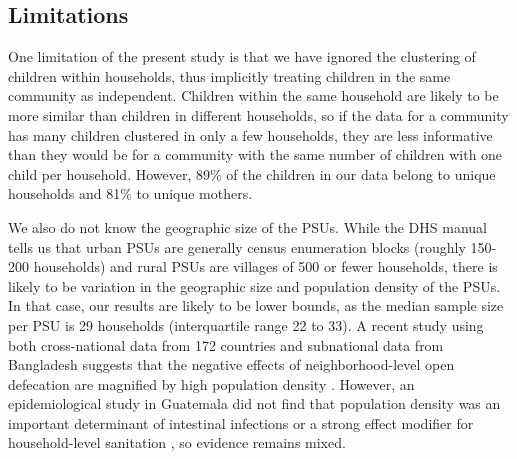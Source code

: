 \documentclass[12pt,a4paper,titlepage]{article}
\begin{document}
\begin{appendices}
\section{Limitations}\label{sec:lims}
One limitation of the present study is that we have ignored the clustering of children within households, thus implicitly treating children in the same community as independent. Children within the same household are likely to be more similar than children in different households, so if the data for a community has many children clustered in only a few households, they are less informative than they would be for a community with the same number of children with one child per household. However, 89\% of the children in our data belong to unique households and 81\% to unique mothers.

We also do not know the geographic size of the PSUs. While the DHS manual tells us that urban PSUs are generally census enumeration blocks (roughly 150-200 households) and rural PSUs are villages of 500 or fewer households, there is likely to be variation in the geographic size and population density of the PSUs. In that case, our results are likely to be lower bounds, as the median sample size per PSU is 29 households (interquartile range 22 to 33). A recent study using both cross-national data from 172 countries and subnational data from Bangladesh suggests that the negative effects of neighborhood-level open defecation are magnified by high population density \citep{hathi2017}. However, an epidemiological study in Guatemala did not find that population density was an important determinant of intestinal infections or a strong effect modifier for household-level sanitation \citep{guatemala}, so evidence remains mixed.

\end{appendices}
\end{document}
